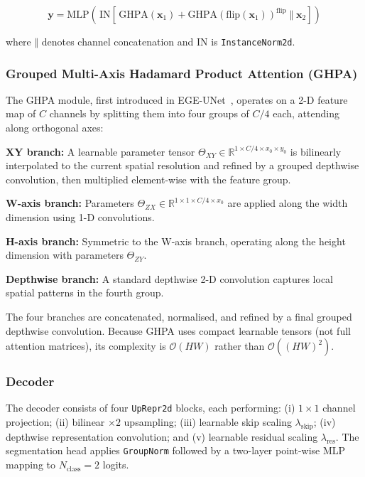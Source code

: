 \documentclass[conference]{IEEEtran}
\begin{document}
\begin{equation}
  \mathbf{y} = \text{MLP}\!\left(\,
    \text{IN}\!\left[\,
      \text{GHPA}(\mathbf{x}_1) +
      \text{GHPA}(\text{flip}(\mathbf{x}_1))^{\text{flip}}
      \;\Vert\; \mathbf{x}_2
    \right]\right)
\end{equation}

where $\Vert$ denotes channel concatenation and $\text{IN}$ is
\texttt{InstanceNorm2d}.

\subsubsection{Grouped Multi-Axis Hadamard Product Attention (GHPA)}

The GHPA module, first introduced in EGE-UNet~\cite{wu2023ege},
operates on a 2-D feature map of $C$ channels by splitting them into
four groups of $C/4$ each, attending along orthogonal axes:

\textbf{XY branch:} A learnable parameter tensor
$\Theta_{XY} \in \mathbb{R}^{1 \times C/4 \times x_0 \times y_0}$
is bilinearly interpolated to the current spatial resolution and
refined by a grouped depthwise convolution, then multiplied
element-wise with the feature group.

\textbf{W-axis branch:} Parameters
$\Theta_{ZX} \in \mathbb{R}^{1\times1\times C/4 \times x_0}$
are applied along the width dimension using 1-D convolutions.

\textbf{H-axis branch:} Symmetric to the W-axis branch, operating
along the height dimension with parameters $\Theta_{ZY}$.

\textbf{Depthwise branch:} A standard depthwise 2-D convolution
captures local spatial patterns in the fourth group.

The four branches are concatenated, normalised, and refined by a
final grouped depthwise convolution. Because GHPA uses compact
learnable tensors (not full attention matrices), its complexity is
$\mathcal{O}(HW)$ rather than $\mathcal{O}((HW)^2)$.

\subsubsection{Decoder}

The decoder consists of four \texttt{UpRepr2d} blocks, each
performing: (i) $1{\times}1$ channel projection; (ii) bilinear
${\times}2$ upsampling; (iii) learnable skip scaling
$\lambda_\text{skip}$; (iv) depthwise representation convolution;
and (v) learnable residual scaling $\lambda_\text{res}$. The
segmentation head applies \texttt{GroupNorm} followed by a two-layer
point-wise MLP mapping to $N_\text{class}{=}2$ logits.
\end{document}
